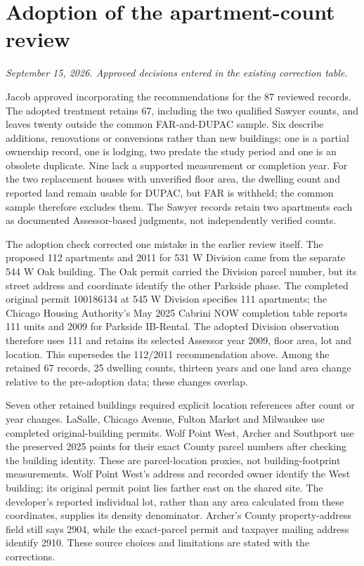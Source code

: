 \clearpage
\section*{Adoption of the apartment-count review}
\textit{September 15, 2026. Approved decisions entered in the existing correction table.}

Jacob approved incorporating the recommendations for the 87 reviewed records.
The adopted treatment retains 67, including the two qualified Sawyer counts,
and leaves twenty outside the common FAR-and-DUPAC sample. Six describe
additions, renovations or conversions rather than new buildings; one is a
partial ownership record, one is lodging, two predate the study period and
one is an obsolete duplicate. Nine lack a supported measurement or completion
year. For the two replacement houses with unverified floor area, the dwelling
count and reported land remain usable for DUPAC, but FAR is withheld; the
common sample therefore excludes them. The Sawyer records retain two apartments
each as documented Assessor-based judgments, not independently verified counts.

The adoption check corrected one mistake in the earlier review itself.
The proposed 112 apartments and 2011 for 531 W Division came from the separate
544 W Oak building. The Oak permit carried the Division parcel number, but
its street address and coordinate identify the other Parkside phase. The
completed original permit 100186134 at 545 W Division specifies 111 apartments;
the Chicago Housing Authority's May 2025 Cabrini NOW completion table reports
111 units and 2009 for Parkside IB-Rental. The adopted Division observation
therefore uses 111 and retains its selected Assessor year 2009, floor area,
lot and location. This supersedes the 112/2011 recommendation above. Among
the retained 67 records, 25 dwelling counts, thirteen years and one land area
change relative to the pre-adoption data; these changes overlap.

Seven other retained buildings required explicit location references after
count or year changes. LaSalle, Chicago Avenue, Fulton Market and Milwaukee
use completed original-building permits. Wolf Point West, Archer and Southport
use the preserved 2025 points for their exact County parcel numbers after
checking the building identity. These are parcel-location proxies, not
building-footprint measurements. Wolf Point West's address and recorded owner
identify the West building; its original permit point lies farther east on
the shared site. The developer's reported individual lot, rather than any
area calculated from these coordinates, supplies its density denominator.
Archer's County property-address field still says 2904, while the exact-parcel
permit and taxpayer mailing address identify 2910. These source choices and
limitations are stated with the corrections.

